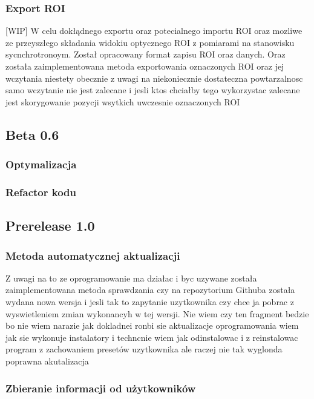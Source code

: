 \documentclass[11pt,a4paper]{article}
\begin{document}
    \subsubsection{Export ROI}[WIP]
    \hspace{1cm} W celu dokłądnego exportu oraz potecialnego importu ROI oraz mozliwe ze przeyszłego składania widokiu optycznego ROI z pomiarami na stanowisku sycnchrotronoym. Został opracowany format zapisu ROI oraz danych. Oraz została zaimplementowana metoda exportowania oznaczonych ROI oraz jej wczytania niestety obecznie z uwagi na niekoniecznie dostateczna powtarzalnosc samo wczytanie nie jest zalecane i jesli ktos chciałby tego wykorzystac zalecane jest skorygowanie pozycji wsytkich uwczesnie oznaczonych ROI

    \subsection{Beta 0.6}

    \subsubsection{Optymalizacja}

    \subsubsection{Refactor kodu}

    \subsection{Prerelease 1.0}

    \subsubsection{Metoda automatycznej aktualizacji}
    \hspace{1cm} Z uwagi na to ze oprogramowanie ma działac i byc uzywane została zaimplementowana metoda sprawdzania czy na repozytorium Githuba została wydana nowa wersja i jesli tak to zapytanie uzytkownika czy chce ja pobrac z wyswietleniem zmian wykonancyh w tej wersji.  {\color{red} Nie wiem czy ten fragment bedzie bo nie wiem narazie jak dokladnei ronbi sie aktualizacje oprogramowania wiem jak sie wykonuje instalatory i techncnie wiem jak odinstalowac i z reinstalowac program z zachowaniem presetów uzytkownika ale raczej nie tak wyglonda poprawna akutalizacja}

    \subsubsection{Zbieranie informacji od użytkowników}
\end{document}
